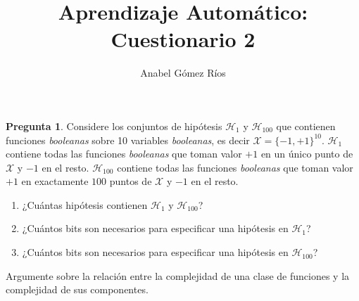 \documentclass[12pt]{article}
\title{Aprendizaje Automático: Cuestionario 2}
\author{Anabel G\'omez R\'ios}
\theoremstyle{definition}
\begin{document}
\maketitle

\newtheorem{pregunta}{Pregunta}

\begin{pregunta}
Considere los conjuntos de hipótesis $\mathcal{H}_1$ y $\mathcal{H}_{100}$ que contienen funciones \textit{booleanas} sobre 10 variables \textit{booleanas}, es decir $\mathcal{X} = \{-1, +1\}^{10}$. $\mathcal{H}_1$ contiene todas las funciones \textit{booleanas} que toman valor $+1$ en un único punto de $\mathcal{X}$ y $-1$ en el resto. $\mathcal{H}_{100}$ contiene todas las funciones \textit{booleanas} que toman valor $+1$ en exactamente $100$ puntos de $\mathcal{X}$ y $-1$ en el resto.
\begin{enumerate}[a]
\item ¿Cuántas hipótesis contienen $\mathcal{H}_1$ y $\mathcal{H}_{100}$?
\item ¿Cuántos bits son necesarios para especificar una hipótesis en $\mathcal{H}_1$?
\item ¿Cuántos bits son necesarios para especificar una hipótesis en $\mathcal{H}_{100}$?
\end{enumerate}

Argumente sobre la relación entre la complejidad de una clase de funciones y la complejidad de sus componentes.\\


\end{pregunta}
\end{document}
